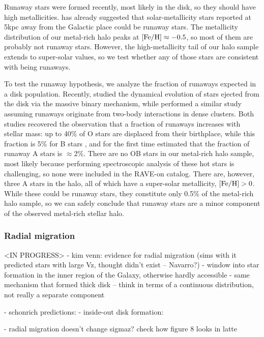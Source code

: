\documentclass[apj, twocolappendix, numberedappendix, appendixfloats]{emulateapj}
\begin{document}
Runaway stars were formed recently, most likely in the disk, so they should have high metallicities.
\citet{bromley2009} has already suggested that solar-metallicity stars reported at 5\;kpc away from the Galactic place \citep{ivezic2008} could be runaway stars.
The metallicity distribution of our metal-rich halo peaks at $\rm[Fe/H]\approx-0.5$, so most of them are probably not runaway stars.
However, the high-metallicity tail of our halo sample extends to super-solar values, so we test whether any of those stars are consistent with being runaways.

To test the runaway hypothesis, we analyze the fraction of runaways expected in a disk population.
Recently, \citet{bromley2009} studied the dynamical evolution of stars ejected from the disk via the massive binary mechanism, while \citet{perets2012} performed a similar study assuming runaways originate from two-body interactions in dense clusters.
Both studies recovered the observation that a fraction of runaways increases with stellar mass: up to 40\% of O stars are displaced from their birthplace, while this fraction is 5\% for B stars \citep{blaauw1961, gies1986}, and for the first time estimated that the fraction of runaway A stars is $\approx2\%$.
There are no OB stars in our metal-rich halo sample, most likely because performing spectroscopic analysis of these hot stars is challenging, so none were included in the RAVE-on catalog.
There are, however, three A stars in the halo, all of which have a super-solar metallicity, $\rm[Fe/H]>0$.
While these could be runaway stars, they constitute only 0.5\% of the metal-rich halo sample, so we can safely conclude that runaway stars are a minor component of the observed metal-rich stellar halo.

\subsubsection{Radial migration}
\label{sec:migration}
<IN PROGRESS>
- kim venn: evidence for radial migration (sims with it predicted stars with large Vz, thought didn't exist -- Navarro?)
- window into star formation in the inner region of the Galaxy, otherwise hardly accessible
- same mechanism that formed thick disk -- think in terms of a continuous distribution, not really a separate component

- schonrich predictions: %
- inside-out disk formation: %

- radial migration doesn't change sigmaz? check how figure 8 looks in latte %
\end{document}
